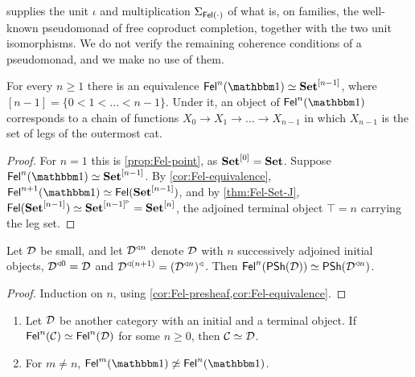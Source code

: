 \begin{remark}\label{rem:pseudomonad}
 supplies the unit $\iota$ and multiplication
$\Sigma_{\mathsf{Fel}(\cdot)}$ of what is, on families, the well-known pseudomonad of
free coproduct completion, together with the two unit isomorphisms. We do not
verify the remaining coherence conditions of a pseudomonad, and we make no use
of them.
\end{remark}

\begin{theorem}\label{thm:iterated-point}
For every $n\geq1$ there is an equivalence $\Fel^n(\one)\eqv\Set^{[n-1]}$,
where $[n-1]=\{0<1<\dots<n-1\}$. Under it, an object of $\Fel^n(\one)$
corresponds to a chain of functions $X_0\to X_1\to\dots\to X_{n-1}$ in which
$X_{n-1}$ is the set of legs of the outermost cat.
\end{theorem}

\begin{proof}
For $n=1$ this is \cref{prop:Fel-point}, as $\mathbf{Set}^{[0]}=\mathbf{Set}$. Suppose
$\Fel^n(\one)\eqv\Set^{[n-1]}$. By \cref{cor:Fel-equivalence},
$\Fel^{n+1}(\one)\eqv\Fel(\Set^{[n-1]})$, and by \cref{thm:Fel-Set-J},
$\mathsf{Fel}(\mathbf{Set}^{[n-1]})\simeq\mathbf{Set}^{[n-1]^{\triangleright}}=\mathbf{Set}^{[n]}$, the adjoined
terminal object $\top=n$ carrying the leg set.
\end{proof}

\begin{theorem}\label{thm:iterated-presheaf}
Let $\mathcal{D}$ be small, and let $\mathcal{D}^{\triangleleft n}$ denote $\mathcal{D}$ with $n$
successively adjoined initial objects, $\mathcal{D}^{\triangleleft 0}=\mathcal{D}$ and
$\mathcal{D}^{\triangleleft(n+1)}=(\mathcal{D}^{\triangleleft n})^{\triangleleft}$. Then
$\mathsf{Fel}^n(\mathsf{PSh}(\mathcal{D}))\simeq\mathsf{PSh}(\mathcal{D}^{\triangleleft n})$.
\end{theorem}

\begin{proof}
Induction on $n$, using \cref{cor:Fel-presheaf,cor:Fel-equivalence}.
\end{proof}

\begin{corollary}\label{cor:tower}
\begin{enumerate}
\item Let $\mathcal{D}$ be another category with an initial and a terminal object. If
  $\mathsf{Fel}^n(\mathcal{C})\simeq\mathsf{Fel}^n(\mathcal{D})$ for some $n\geq0$, then $\mathcal{C}\simeq\mathcal{D}$.
\item For $m\neq n$, $\Fel^m(\one)\not\eqv\Fel^n(\one)$.
\end{enumerate}
\end{corollary}

